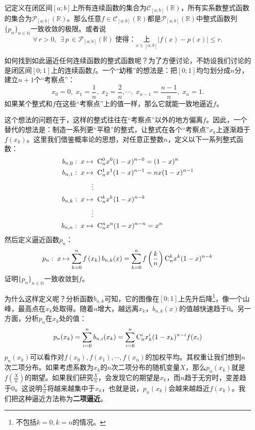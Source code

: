 \documentclass[12pt,UTF8,fontset=none]{ctexbook}
\begin{document}
\begin{tm}
    记定义在闭区间$[a;b]$上所有连续函数的集合为$\mathcal{C}_{[a;b]}(\mathbb{R})$，所有实系数整式函数的集合为$\mathcal{P}_{[a;b]}(\mathbb{R})$。那么任意$f\in\mathcal{C}_{[a;b]}(\mathbb{R})$都是$\mathcal{P}_{[a;b]}(\mathbb{R})$中整式函数列$\{p_n\}_{n\in\mathbb{N}}$一致收敛的极限。或者说
    $$ \forall \, r > 0, \;\, \exists \, p \, \in \mathcal{P}_{[a;b]}(\mathbb{R}) \; \mbox{使得：} \underset{x\in [a;b]}{\text{上}} \left| f(x) - p(x) \right| \leqslant r.$$
\end{tm}

如何找到如此逼近任何连续函数的整式函数呢？为了方便讨论，不妨设我们讨论的是闭区间$[0;1]$上的连续函数$f$。一个“幼稚”的想法是：把$[0;1]$均匀划分成$n$分，建立$n+1$个“考察点”：
$$ x_0 = 0, \; x_1 = \frac{1}{n}, \; x_2 = \frac{2}{n}, \cdots, \; x_{n-1} = \frac{n-1}{n}, \; x_{n} = 1. $$
如果某个整式和$f$在这些“考察点”上的值一样，那么它就能一致地逼近$f$。

这个想法的问题在于，这样的整式往往在“考察点”以外的地方偏离$f$。因此，一个替代的想法是：制造一系列更“平稳”的整式，让整式在各个“考察点”$x_k$上逐渐趋于$f(x_k)$。这里我们借鉴概率论的思想，对任意正整数$n$，定义以下一系列整式函数：
\begin{align*}
    b_{n,0}:\; x &\mapsto \;\mathrm{C}_{n}^{0} x^0(1 - x)^{n-0} = (1 - x)^{n} \\
    b_{n,1}:\; x &\mapsto \;\mathrm{C}_{n}^{1} x^1(1 - x)^{n-1} = nx(1 - x)^{n-1} \\
    &\quad \vdots \\
    b_{n,k}:\; x &\mapsto \;\mathrm{C}_{n}^{k} x^k(1 - x)^{n-k} \\
    &\quad \vdots \\
    b_{n,n}:\; x &\mapsto \;\mathrm{C}_{n}^{n} x^n(1 - x)^{n-n} = x^{n} 
\end{align*}
然后定义逼近函数$p_n$：
\begin{align*}
    p_n: \; x\mapsto \sum_{k=0}^n f\left(x_k\right) b_{n,k}(x) = \sum_{k=0}^n f\left(\frac{k}{n}\right) \mathrm{C}_{n}^{k} x^k(1 - x)^{n-k}
\end{align*}
证明$\{p_n\}_{n\in\mathbb{N}}$一致收敛到$f$。

为什么这样定义呢？分析函数$b_{n,k}$可知，它的图像在$[0;1]$上先升后降\footnote{不包括$k=0,k=n$的情况。}，像一个山峰，最高点在$x_k$处取得。随着$n$增大，越远离$x_k$，$b_{n,k}(x)$的值越快速趋于$0$。另一方面，分析$p_n$在$x_k$处的值：
\begin{align*}
    p_n(x_k) = \sum_{i=0}^n b_{n,i}(x_k) = \sum_{i=0}^n \mathrm{C}_{n}^{i} x_k^i(1 - x_k)^{n-i} f(x_i) 
\end{align*}
$p_n(x_k)$可以看作对$f(x_0), f(x_1), \cdots, f(x_n)$的加权平均。其权重让我们想到$n$次二项分布。如果考虑系数为$x_k$的$n$次二项分布的随机变量$X$，那么$p_n(x_k)$就是$\displaystyle f\left(\frac{X}{n}\right)$的期望。如果我们研究$\frac{X}{n}$，会发现它的期望是$x_k$，而$n$趋于无穷时，变差趋于$0$。这说明$\frac{X}{n}$将越来越集中于$x_k$，也就是说，$p_n(x_k)$会越来越趋近$f(x_k)$。我们把这种逼近方法称为\textbf{二项逼近}。
\end{document}
